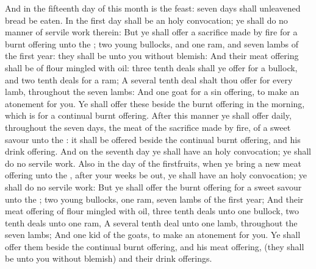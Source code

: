 \begin{biblechapter}
\verse And in the fifteenth day of this month is the feast: seven days shall unleavened bread be eaten.
\verse In the first day shall be an holy convocation; ye shall do no manner of servile work therein:
\verse But ye shall offer a sacrifice made by fire for a burnt offering unto the \LORD; two young bullocks, and one ram, and seven lambs of the first year: they shall be unto you without blemish:
\verse And their meat offering shall be of flour mingled with oil: three tenth deals shall ye offer for a bullock, and two tenth deals for a ram;
\verse A several tenth deal shalt thou offer for every lamb, throughout the seven lambs:
\verse And one goat for a sin offering, to make an atonement for you.
\verse Ye shall offer these beside the burnt offering in the morning, which is for a continual burnt offering.
\verse After this manner ye shall offer daily, throughout the seven days, the meat of the sacrifice made by fire, of a sweet savour unto the \LORD: it shall be offered beside the continual burnt offering, and his drink offering.
\verse And on the seventh day ye shall have an holy convocation; ye shall do no servile work.
 Also in the day of the firstfruits, when ye bring a new meat offering unto the \LORD, after your weeks be out, ye shall have an holy convocation; ye shall do no servile work:
\verse But ye shall offer the burnt offering for a sweet savour unto the \LORD; two young bullocks, one ram, seven lambs of the first year;
\verse And their meat offering of flour mingled with oil, three tenth deals unto one bullock, two tenth deals unto one ram,
\verse A several tenth deal unto one lamb, throughout the seven lambs;
\verse And one kid of the goats, to make an atonement for you.
\verse Ye shall offer them beside the continual burnt offering, and his meat offering, (they shall be unto you without blemish) and their drink offerings.
\end{biblechapter}

